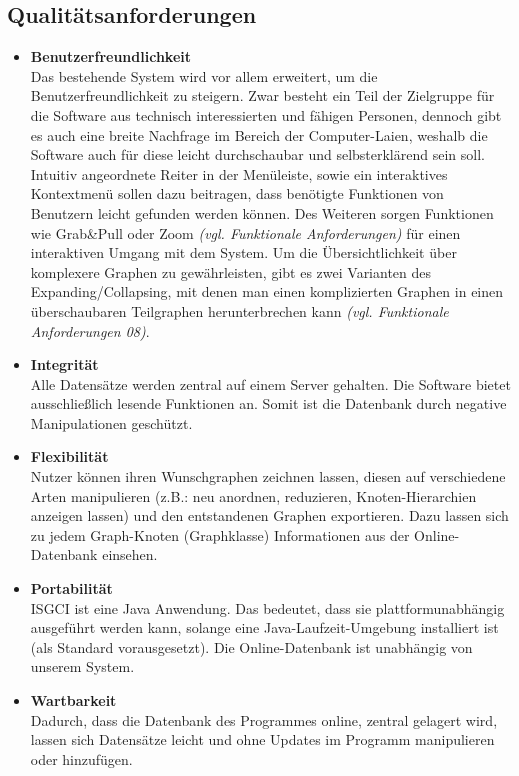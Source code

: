 \documentclass[10pt,a4paper]{article}
\begin{document}
	\subsection{Qualitätsanforderungen} %
		\begin{itemize}	
		\item \textbf{Benutzerfreundlichkeit}\\
		Das bestehende System wird vor allem erweitert, um die Benutzerfreundlichkeit zu steigern. Zwar besteht ein Teil der Zielgruppe für die Software aus technisch interessierten und fähigen Personen, dennoch gibt es auch eine breite Nachfrage im Bereich der Computer-Laien, weshalb die Software auch für diese leicht durchschaubar und selbsterklärend sein soll. Intuitiv angeordnete Reiter in der Menüleiste, sowie ein interaktives Kontextmenü sollen dazu beitragen, dass benötigte Funktionen von Benutzern leicht gefunden werden können. Des Weiteren sorgen Funktionen wie Grab\&Pull oder Zoom \textit{(vgl. Funktionale Anforderungen)} für einen interaktiven Umgang mit dem System. Um die Übersichtlichkeit über komplexere Graphen zu gewährleisten, gibt es zwei Varianten des Expanding/Collapsing, mit denen man einen komplizierten Graphen in einen überschaubaren Teilgraphen herunterbrechen kann \textit{(vgl. Funktionale Anforderungen 08)}.
		\item \textbf{Integrität}\\
		Alle Datensätze werden zentral auf einem Server gehalten. Die Software bietet ausschließlich lesende Funktionen an. Somit ist die Datenbank durch negative Manipulationen geschützt.
		\item \textbf{Flexibilität}\\
		Nutzer können ihren Wunschgraphen zeichnen lassen, diesen auf verschiedene Arten manipulieren (z.B.: neu anordnen, reduzieren, Knoten-Hierarchien anzeigen lassen) und den entstandenen Graphen exportieren. Dazu lassen sich zu jedem Graph-Knoten (Graphklasse) Informationen aus der Online-Datenbank einsehen. 
		\item \textbf{Portabilität}\\
		ISGCI ist eine Java Anwendung. Das bedeutet, dass sie plattformunabhängig ausgeführt werden kann, solange eine Java-Laufzeit-Umgebung installiert ist (als Standard vorausgesetzt).
		Die Online-Datenbank ist unabhängig von unserem System. 
		\item \textbf{Wartbarkeit}\\
		Dadurch, dass die Datenbank des Programmes online, zentral gelagert wird, lassen sich Datensätze leicht und ohne Updates im Programm manipulieren oder hinzufügen.
		\end{itemize}
		
\end{document}
